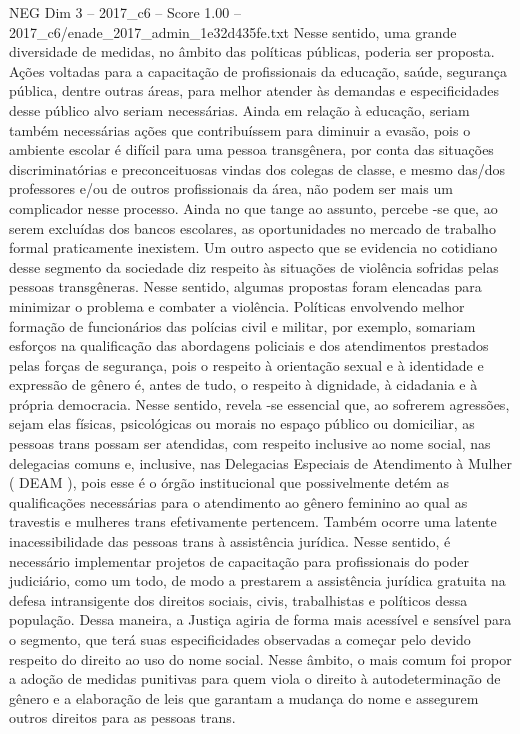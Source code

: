 \begin{textsample}{NEG Dim 3 – 2017\_c6 – Score 1.00 – 2017\_c6/enade\_2017\_admin\_1e32d435fe.txt}
Nesse sentido, uma grande diversidade de medidas, no âmbito das políticas públicas, poderia ser proposta.
Ações voltadas para a capacitação de profissionais da educação, saúde, segurança pública, dentre outras áreas, para melhor atender às demandas e especificidades desse público alvo seriam necessárias.
Ainda em relação à educação, seriam também necessárias ações que contribuíssem para diminuir a evasão, pois o ambiente escolar é difícil para uma pessoa transgênera, por conta das situações discriminatórias e preconceituosas vindas dos colegas de classe, e mesmo das/dos professores e/ou de outros profissionais da área, não podem ser mais um complicador nesse processo.
Ainda no que tange ao assunto, percebe -se que, ao serem excluídas dos bancos escolares, as oportunidades no mercado de trabalho formal praticamente inexistem.
Um outro aspecto que se evidencia no cotidiano desse segmento da sociedade diz respeito às situações de violência sofridas pelas pessoas transgêneras.
Nesse sentido, algumas propostas foram elencadas para minimizar o problema e combater a violência.
Políticas envolvendo melhor formação de funcionários das polícias civil e militar, por exemplo, somariam esforços na qualificação das abordagens policiais e dos atendimentos prestados pelas forças de segurança, pois o respeito à orientação sexual e à identidade e expressão de gênero é, antes de tudo, o respeito à dignidade, à cidadania e à própria democracia.
Nesse sentido, revela -se essencial que, ao sofrerem agressões, sejam elas físicas, psicológicas ou morais no espaço público ou domiciliar, as pessoas trans possam ser atendidas, com respeito inclusive ao nome social, nas delegacias comuns e, inclusive, nas Delegacias Especiais de Atendimento à Mulher ( DEAM ), pois esse é o órgão institucional que possivelmente detém as qualificações necessárias para o atendimento ao gênero feminino ao qual as travestis e mulheres trans efetivamente pertencem.
Também ocorre uma latente inacessibilidade das pessoas trans à assistência jurídica.
Nesse sentido, é necessário implementar projetos de capacitação para profissionais do poder judiciário, como um todo, de modo a prestarem a assistência jurídica gratuita na defesa intransigente dos direitos sociais, civis, trabalhistas e políticos dessa população.
Dessa maneira, a Justiça agiria de forma mais acessível e sensível para o segmento, que terá suas especificidades observadas a começar pelo devido respeito do direito ao uso do nome social.
Nesse âmbito, o mais comum foi propor a adoção de medidas punitivas para quem viola o direito à autodeterminação de gênero e a elaboração de leis que garantam a mudança do nome e assegurem outros direitos para as pessoas trans.

\end{textsample}
